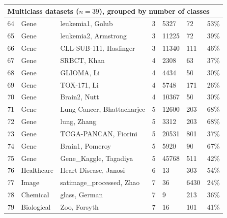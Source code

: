 \documentclass[preprint,12pt,authoryear]{elsarticle}
\begin{document}
{{\begin{longtable}{|c|p{1.9cm}|p{6.7cm}|c|p{0.75cm}|p{0.75cm}|p{0.75cm}|}
\multicolumn{7}{|l|}{\textbf{Multiclass datasets ($n=39$), grouped by number of classes}} \\
\hline
64  & Gene       & leukemia1, Golub \citeyearpar{golub1999molecular}             & 3 & 5327  & 72   & 53\% \\
65  & Gene       & leukemia2, Armstrong \citeyearpar{armstrong2002mll}               & 3 & 11225 & 72   & 39\% \\
66  & Gene       & CLL-SUB-111, Haslinger \citeyearpar{haslinger2004microarray}      & 3 & 11340 & 111  & 46\% \\ \hline
67  & Gene       & SRBCT, Khan \citeyearpar{khan2001classification}              & 4 & 2308  & 63   & 37\% \\
68  & Gene       & GLIOMA, Li \citeyearpar{li2017feature}                      & 4 & 4434  & 50   & 30\% \\
69  & Gene       & TOX-171, Li \citeyearpar{li2017feature}                     & 4 & 5748  & 171  & 26\% \\
70  & Gene       & Brain2, Nutt \citeyearpar{nutt2003gene}                       & 4 & 10367 & 50   & 30\% \\ \hline
71  & Gene       & Lung Cancer, Bhattacharjee \citeyearpar{bhattacharjee2001classification}& 5 & 12600 & 203  & 68\% \\
72  & Gene       & lung, Zhang \citeyearpar{zhang2019unsupervised}                 & 5 & 3312  & 203  & 68\% \\
73  & Gene       & TCGA-PANCAN, Fiorini \citeyearpar{gene_expression_cancer_rna-seq_401} & 5 & 20531 & 801 & 37\% \\
74  & Gene       & Brain1, Pomeroy \citeyearpar{pomeroy2002prediction}               & 5 & 5920  & 90   & 67\% \\
75  & Gene       & Gene\_Kaggle, Tagadiya \citeyearpar{tagadiya_genesdata}            & 5 & 45768 & 511  & 42\% \\ \hline
76  & Healthcare & Heart Disease, Janosi \citeyearpar{heart_disease_45}             & 6 & 13    & 303  & 54\% \\ \hline
77  & Image      & satimage\_processed, Zhao \citeyearpar{zhao2024weakly}         & 7 & 36    & 6430 & 24\% \\
78  & Chemical   & glass, German \citeyearpar{glass_identification_42}              & 7 & 9     & 213  & 36\% \\
79  & Biological & Zoo, Forsyth \citeyearpar{zoo_111}                                & 7 & 16    & 101  & 41\% \\ \hline

\end{longtable}}}
\end{document}
